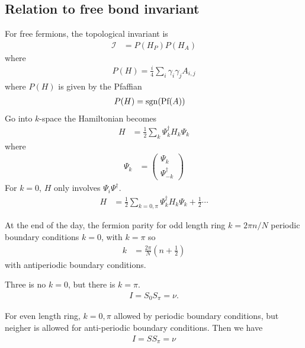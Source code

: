 \subsection{Relation to free bond invariant}
For free fermions,
the topological invariant is
\begin{align}
    \mathcal{I} &=
    P\left( H_P \right) P\left( H_A \right)
\end{align}
where
\begin{align}
    P(H) = \frac{i}{4} \sum_{i} \gamma_i \gamma_j A_{i,j}
\end{align}
where $P(H)$ is given by the Pfaffian
\begin{align}
    P(H) &= \operatorname{sgn}(\textrm{Pf}(A))
\end{align}
Go into $k$-space the Hamiltonian becomes
\begin{align}
    H &=
    \frac{1}{2} \sum_{k}
    \Psi_k^\dagger H_k \Psi_k
\end{align}
where
\begin{align}
    \Psi_k &=
    \begin{pmatrix}
        \Psi_k\\
        \Psi_{-k}^\dagger
    \end{pmatrix}
\end{align}
For $k=0$,
$H$
only 
involves $\Psi_i\Psi^\dagger$.
\begin{align}
    H &=
    \frac{1}{2} \sum_{k = 0, \pi}
    \Psi_k^\dagger
    H_k\Psi_{k}
    + \frac{1}{2}\cdots
\end{align}

At the end of the day,
the fermion parity for odd length ring
$k=2\pi n/N$ periodic boundary conditions
$k=0$, with $k=\pi$ so
\begin{align}
    k &= \frac{2\pi}{N}\left( n + \frac{1}{2} \right)
\end{align}
with antiperiodic boundary conditions.

Three is no $k=0$,
but there is $k=\pi$.
\begin{align}
    I = S_0 S_\pi = \nu.
\end{align}

For even length ring,
$k=0,\pi$ allowed by periodic boundary conditions,
but neigher is allowed for anti-periodic boundary conditions.
Then we have
\begin{align}
    I = S S_{\pi} = \nu
\end{align}

